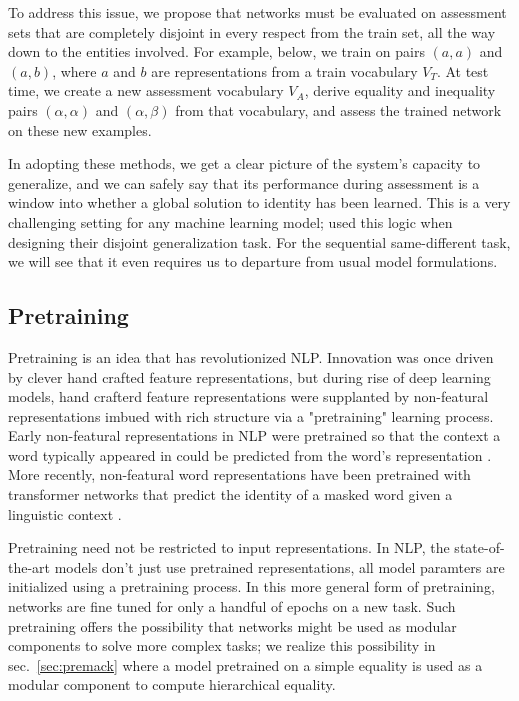 \documentclass{article}
\newcommand{\secref}[1]{sec.~\ref{#1}}
\newcommand{\updatea}[1]{{\color{darkred}#1}}
\begin{document}
To address this issue, we propose that networks must be evaluated on assessment sets that are completely disjoint in every respect from the train set, all the way down to the entities involved. For example, below, we train on pairs $(a, a)$ and $(a, b)$, where $a$ and $b$ are representations from a train vocabulary $V_{T}$. At test time, we create a new assessment vocabulary $V_{A}$, derive equality and inequality pairs $(\alpha, \alpha)$ and $(\alpha, \beta)$ from that vocabulary, and assess the trained network on these new examples. \updatea{ In adopting these methods, we get a clear picture of the system's capacity to generalize, and we can safely say that its performance during assessment is a window into whether a global solution to identity has been learned. This is a very challenging setting for any machine learning model;\citep{marcus:1999} used this logic when designing their disjoint generalization task.  For the sequential same-different task, we will see that it even requires us to departure from usual model formulations. 
 


\subsection{Pretraining}

Pretraining is an idea that has revolutionized NLP. Innovation was once driven by clever hand crafted feature representations, but during rise of deep learning models, hand crafterd feature representations were supplanted by non-featural representations imbued with rich structure via a "pretraining" learning process. Early non-featural representations in NLP were pretrained so that the context a word typically appeared in could be predicted from the word's representation \cite{GLOVE} \cite{Word2Vec}. More recently, non-featural word representations have been pretrained with transformer networks that predict the identity of a masked word given a linguistic context \cite{BERT}. 

Pretraining need not be restricted to input representations. In NLP, the state-of-the-art models don't just use pretrained representations, all model paramters are initialized using a pretraining process. In this more general form of pretraining, networks are fine tuned for only a handful of epochs on a new task. Such pretraining offers the possibility that networks might be used as modular components to solve more complex tasks; we realize this possibility in \secref{sec:premack} where a model pretrained on a simple equality is used as a modular component to compute hierarchical equality. 

}
\end{document}
